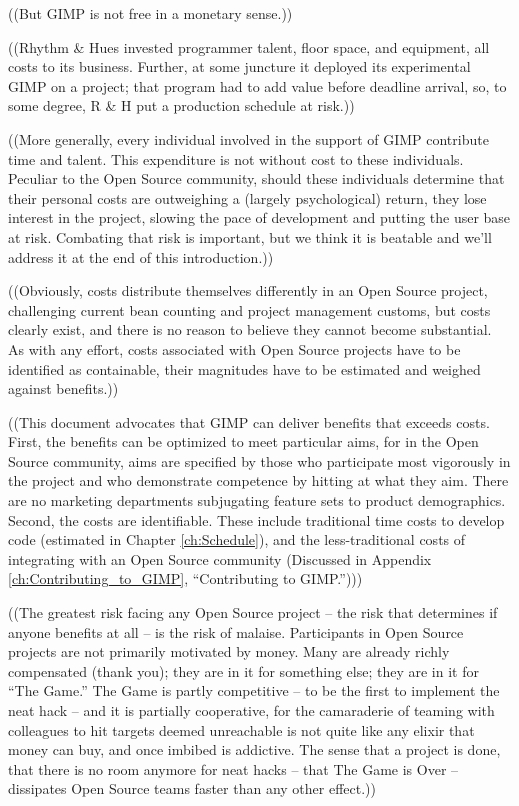 ((But GIMP is not free in a monetary sense.)) 

((Rhythm \& Hues invested programmer talent, floor space, and equipment,
all costs to its business. Further, at some juncture it deployed its
experimental GIMP on a project; that program had to add value before
deadline arrival, so, to some degree, R \& H put a production schedule
at risk.))

((More generally, every individual involved in the support of GIMP
contribute time and talent. This expenditure is not without cost to
these individuals. Peculiar to the Open Source community, should these
individuals determine that their personal costs are outweighing a
(largely psychological) return, they lose interest in the project,
slowing the pace of development and putting the user base at risk.
Combating that risk is important, but we think it is beatable and
we'll address it at the end of this introduction.))

((Obviously, costs distribute themselves differently in an Open Source
project, challenging current bean counting and project management
customs, but costs clearly exist, and there is no reason to believe
they cannot become substantial. As with any effort, costs associated
with Open Source projects have to be identified as containable, their
magnitudes have to be estimated and weighed against benefits.))

((This document advocates that GIMP can deliver benefits that exceeds
costs. First, the benefits can be optimized to meet particular aims,
for in the Open Source community, aims are specified by those who
participate most vigorously in the project and who demonstrate
competence by hitting at what they aim. There are no marketing
departments subjugating feature sets to product demographics. Second,
the costs are identifiable. These include traditional time costs to
develop code (estimated in Chapter \ref{ch:Schedule}), and the
less-traditional costs of integrating with an Open Source community
(Discussed in Appendix \ref{ch:Contributing_to_GIMP}, ``Contributing
to GIMP.'')))

((The greatest risk facing any Open Source project -- the risk
that determines if anyone benefits at all -- is the risk of malaise.
Participants in Open Source projects are not primarily motivated by
money. Many are already richly compensated (thank you); they 
are in it for something else; they are in it for ``The Game.''
The Game is partly competitive -- to be the first to implement
the neat hack -- and it is partially cooperative, for the 
camaraderie of teaming with colleagues to hit targets deemed
unreachable is not quite like any elixir that money can buy, and
once imbibed is addictive. The sense that a project is 
done, that there is no room anymore for neat hacks -- that The
Game is Over -- dissipates Open Source teams faster than any
other effect.))

